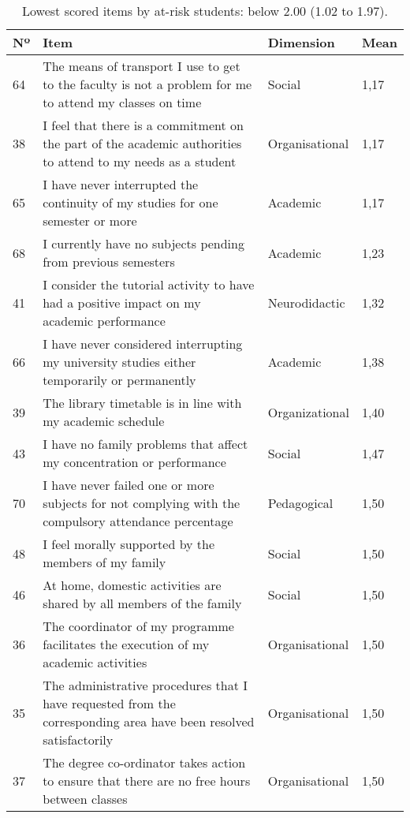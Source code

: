 \documentclass[english]{textolivre}
\begin{document}
\begin{table}[htbp]
\centering
\small
\begin{threeparttable}
\caption{Lowest scored items by at-risk students: below 2.00 (1.02 to 1.97).}
\label{tab06}
\begin{tabular}{p{1cm} p{7cm} p{2cm} p{2cm}}
\toprule
Nº & Item & Dimension & Mean \\
\midrule
64 & The means of transport I use to get to the faculty is not a problem for me to attend my classes on time	 & Social & 1,17   \\
38 & I feel that there is a commitment on the part of the academic authorities to attend to my needs as a student    & Organisational & 1,17  \\
65 & I have never interrupted the continuity of my studies for one semester or more & Academic & 1,17 \\
68 & I currently have no subjects pending from previous semesters & Academic & 1,23 \\
41 & I consider the tutorial activity to have had a positive impact on my academic performance & Neurodidactic & 1,32 \\
66 & I have never considered interrupting my university studies either temporarily or permanently	& Academic & 1,38 \\
39 & The library timetable is in line with my academic schedule & Organizational & 1,40 \\
43 & I have no family problems that affect my concentration or performance & Social & 1,47 \\
70 & I have never failed one or more subjects for not complying with the compulsory attendance percentage & Pedagogical & 1,50 \\
48 & I feel morally supported by the members of my family  & Social & 1,50 \\
46 & At home, domestic activities are shared by all members of the family  & Social & 1,50 \\
36 & The coordinator of my programme facilitates the execution of my academic activities & Organisational & 1,50 \\
35 & The administrative procedures that I have requested from the corresponding area have been resolved satisfactorily & Organisational & 1,50 \\
37 & The degree co-ordinator takes action to ensure that there are no free hours between classes & Organisational & 1,50 \\

\end{tabular}
\end{threeparttable}
\end{table}
\end{document}
